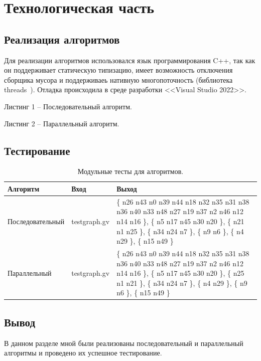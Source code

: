 \chapter{Технологическая часть}


\section{Реализация алгоритмов}
Для реализации алгоритмов использовался язык программирования C++, так как он поддерживает статическую типизацию, имеет возможность отключения сборщика мусора и поддерживаеь нативную многопоточность (библиотека threads~\cite[с.~1217]{lit1}). Отладка происходила в среде разработки <<Visual Studio 2022>>.


Листинг 1 -- Последовательный алгоритм.


Листинг 2 -- Параллельный алгоритм.

\section{Тестирование}

\begin{table}[!htbp]
	\caption{Модульные тесты для алгоритмов.}
	\centering
	
	\begin{tabularx}{\textwidth}{|*{3}{>{\centering\arraybackslash}X|}}
		\hline
		\textbf{Алгоритм} &  \textbf{Вход} & \textbf{Выход}\\\hline
		Последовательный & testgraph.gv & 
		\begin{minipage}{5cm}\scriptsize
			\{ n26 n43 n0 n39 n44 n18 n32 n35 n31 n38 n36 n40 n33 n48 n27 n19 n37 n2 n46 n12 n14 n16 \}, 
			\{ n5 n17 n45 n30 n20 \}, \{ n21 n1 n25 \}, \{ n34 n24 n7 \}, \{ n9 n6 \}, \{ n4 n29 \}, \{ n15 n49 \}
		\end{minipage}
		 \\\hline
		Параллельный & testgraph.gv & 
		\begin{minipage}{5cm}\scriptsize
			\{ n26 n43 n0 n39 n44 n18 n32 n35 n31 n38 n36 n40 n33 n48 n27 n19 n37 n2 n46 n12 n14 n16 \}, 
			\{ n5 n17 n45 n30 n20 \}, \{ n25 n1 n21 \}, \{ n34 n24 n7 \}, \{ n4 n29 \}, \{ n9 n6 \}, \{ n15 n49 \} 
		\end{minipage}
		\\\hline
	\end{tabularx}
\end{table}

\section*{Вывод}

В данном разделе мной были реализованы последовательный и параллельный алгоритмы и проведено их успешное тестирование.

\clearpage
